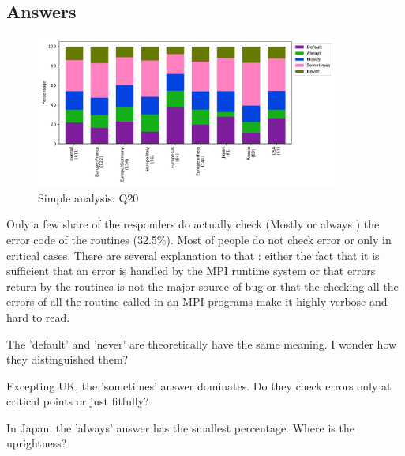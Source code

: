 
\subsection{Answers}


\begin{figure}[htb]
\begin{center}
\includegraphics[width=10cm]{../pdfs/Q20.pdf}
\caption{Simple analysis: Q20}
\label{fig:Q20}
\end{center}
\end{figure}
Only a few share of the responders do actually check (Mostly or always ) the
error code of the routines  (32.5\%). Most of people do not check error or only
in critical cases. There are several explanation to that : either the fact that
it is sufficient that an error is handled by the MPI runtime system or that
errors return by the routines is not the major source of bug or that the
checking all the errors of all the routine called in an MPI programs make it
highly verbose and hard to read.  


The 'default' and 'never' are theoretically have the same meaning. I
wonder how they distinguished them?

Excepting UK, the 'sometimes' answer dominates. Do they check errors
only at critical points or just fitfully?

In Japan, the 'always' answer has the smallest percentage.  Where is
the uprightness?
